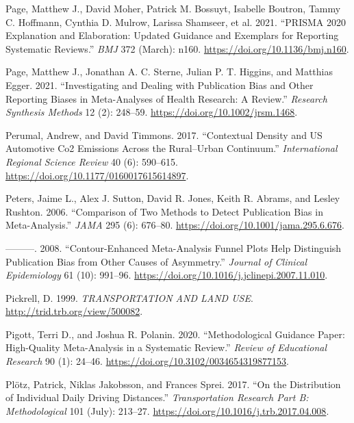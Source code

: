 \documentclass[
  11pt,
  openany]{memoir}
\newlength{\cslhangindent}
\newlength{\cslentryspacingunit} %
\newenvironment{CSLReferences}[2] %
 {%
  \setlength{\parindent}{0pt}
  \ifodd #1
  \let\oldpar\par
  \def\par{\hangindent=\cslhangindent\oldpar}
  \fi
  \setlength{\parskip}{#2\cslentryspacingunit}
 }%
 {}
\begin{document}
\begin{CSLReferences}{1}{0}
\leavevmode{}%
Page, Matthew J., David Moher, Patrick M. Bossuyt, Isabelle Boutron, Tammy C. Hoffmann, Cynthia D. Mulrow, Larissa Shamseer, et al. 2021. {``{PRISMA} 2020 Explanation and Elaboration: Updated Guidance and Exemplars for Reporting Systematic Reviews.''} \emph{BMJ} 372 (March): n160. \url{https://doi.org/10.1136/bmj.n160}.

\leavevmode{}%
Page, Matthew J., Jonathan A. C. Sterne, Julian P. T. Higgins, and Matthias Egger. 2021. {``Investigating and Dealing with Publication Bias and Other Reporting Biases in Meta-Analyses of Health Research: A Review.''} \emph{Research Synthesis Methods} 12 (2): 248--59. \url{https://doi.org/10.1002/jrsm.1468}.

\leavevmode{}%
Perumal, Andrew, and David Timmons. 2017. {``Contextual {Density} and {US Automotive Co2 Emissions} Across the {Rural}--{Urban Continuum}.''} \emph{International Regional Science Review} 40 (6): 590--615. \url{https://doi.org/10.1177/0160017615614897}.

\leavevmode{}%
Peters, Jaime L., Alex J. Sutton, David R. Jones, Keith R. Abrams, and Lesley Rushton. 2006. {``Comparison of {Two Methods} to {Detect Publication Bias} in {Meta}-Analysis.''} \emph{JAMA} 295 (6): 676--80. \url{https://doi.org/10.1001/jama.295.6.676}.

\leavevmode{}%
---------. 2008. {``Contour-Enhanced Meta-Analysis Funnel Plots Help Distinguish Publication Bias from Other Causes of Asymmetry.''} \emph{Journal of Clinical Epidemiology} 61 (10): 991--96. \url{https://doi.org/10.1016/j.jclinepi.2007.11.010}.

\leavevmode{}%
Pickrell, D. 1999. \emph{{TRANSPORTATION AND LAND USE}}. \url{http://trid.trb.org/view/500082}.

\leavevmode{}%
Pigott, Terri D., and Joshua R. Polanin. 2020. {``Methodological {Guidance Paper}: High-{Quality Meta}-{Analysis} in a {Systematic Review}.''} \emph{Review of Educational Research} 90 (1): 24--46. \url{https://doi.org/10.3102/0034654319877153}.

\leavevmode{}%
Plötz, Patrick, Niklas Jakobsson, and Frances Sprei. 2017. {``On the Distribution of Individual Daily Driving Distances.''} \emph{Transportation Research Part B: Methodological} 101 (July): 213--27. \url{https://doi.org/10.1016/j.trb.2017.04.008}.


\end{CSLReferences}
\end{document}
